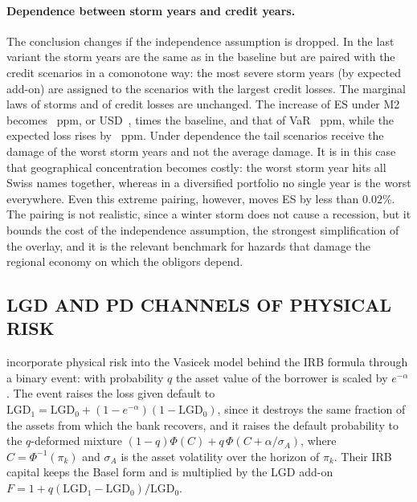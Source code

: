 \paragraph{Dependence between storm years and credit years.}
The conclusion changes if the independence assumption is dropped. In the last variant the storm years are the same as in the baseline but are paired with the credit scenarios in a comonotone way: the most severe storm years (by expected add-on) are assigned to the scenarios with the largest credit losses. The marginal laws of storms and of credit losses are unchanged. The increase of ES under M2 becomes ~ppm, or USD~,  times the baseline, and that of VaR ~ppm, while the expected loss rises by ~ppm. Under dependence the tail scenarios receive the damage of the worst storm years and not the average damage. It is in this case that geographical concentration becomes costly: the worst storm year hits all Swiss names together, whereas in a diversified portfolio no single year is the worst everywhere. Even this extreme pairing, however, moves ES by less than $0.02\%$. The pairing is not realistic, since a winter storm does not cause a recession, but it bounds the cost of the independence assumption, the strongest simplification of the overlay, and it is the relevant benchmark for hazards that damage the regional economy on which the obligors depend.

\subsection{LGD AND PD CHANNELS OF PHYSICAL RISK}
\label{subsec:climbis}
\citet{Pozdyshev25} incorporate physical risk into the Vasicek model behind the IRB formula through a binary event: with probability $q$ the asset value of the borrower is scaled by $e^{-\alpha}$. The event raises the loss given default to $\mathrm{LGD}_1=\mathrm{LGD}_0+(1-e^{-\alpha})(1-\mathrm{LGD}_0)$, since it destroys the same fraction of the assets from which the bank recovers, and it raises the default probability to the $q$-deformed mixture $(1-q)\Phi(C)+q\,\Phi(C+\alpha/\sigma_A)$, where $C=\Phi^{-1}(\pi_k)$ and $\sigma_A$ is the asset volatility over the horizon of $\pi_k$. Their IRB capital keeps the Basel form and is multiplied by the LGD add-on $F=1+q(\mathrm{LGD}_1-\mathrm{LGD}_0)/\mathrm{LGD}_0$.

